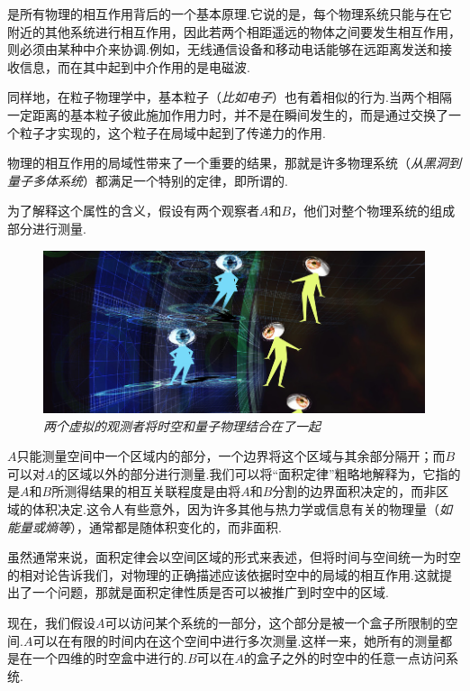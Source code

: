 \begin{multicols}{2}
是所有物理的相互作用背后的一个基本原理.它说的是，每个物理系统只能与在它附近的其他系统进行相互作用，因此若两个相距遥远的物体之间要发生相互作用，则必须由某种中介来协调.例如，无线通信设备和移动电话能够在远距离发送和接收信息，而在其中起到中介作用的是电磁波.

同样地，在粒子物理学中，基本粒子（\textit{比如电子}）也有着相似的行为.当两个相隔一定距离的基本粒子彼此施加作用力时，并不是在瞬间发生的，而是通过交换了一个粒子才实现的，这个粒子在局域中起到了传递力的作用.

物理的相互作用的局域性带来了一个重要的结果，那就是许多物理系统（\textit{从黑洞到量子多体系统}）都满足一个特别的定律，即所谓的.

为了解释这个属性的含义，假设有两个观察者$A$和$B$，他们对整个物理系统的组成部分进行测量.

\begin{figure}[H]
    \centering
    \includegraphics[width=\linewidth]{Interstellar/IMG/201907/csm_slider_quantenkorrelation_1920_2319fd8ab9.jpg}
    \caption{\textit{两个虚拟的观测者将时空和量子物理结合在了一起}}
    
\end{figure}



$A$只能测量空间中一个区域内的部分，一个边界将这个区域与其余部分隔开；而$B$可以对$A$的区域以外的部分进行测量.我们可以将“面积定律”粗略地解释为，它指的是$A$和$B$所测得结果的相互关联程度是由将$A$和$B$分割的边界面积决定的，而非区域的体积决定.这令人有些意外，因为许多其他与热力学或信息有关的物理量（\textit{如能量或熵等}），通常都是随体积变化的，而非面积.

虽然通常来说，面积定律会以空间区域的形式来表述，但将时间与空间统一为时空的相对论告诉我们，对物理的正确描述应该依据时空中的局域的相互作用.这就提出了一个问题，那就是面积定律性质是否可以被推广到时空中的区域.

现在，我们假设$A$可以访问某个系统的一部分，这个部分是被一个盒子所限制的空间.$A$可以在有限的时间内在这个空间中进行多次测量.这样一来，她所有的测量都是在一个四维的时空盒中进行的.$B$可以在$A$的盒子之外的时空中的任意一点访问系统.


\end{multicols}
